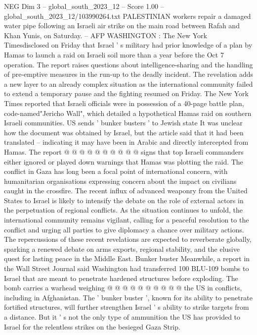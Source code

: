 \begin{textsample}{NEG Dim 3 – global\_south\_2023\_12 – Score 1.00 – global\_south\_2023\_12/103990264.txt}  \label{ex:f3_neg_011}
PALESTINIAN workers repair a damaged water pipe following an Israeli air strike on the main road between Rafah and Khan Yunis, on Saturday. -- AFP WASHINGTON : The New York Timesdisclosed on Friday that Israel ' s military had prior knowledge of a plan by Hamas to launch a raid on Israeli soil more than a year before the Oct 7 operation.
The report raises questions about intelligence-sharing and the handling of pre-emptive measures in the run-up to the deadly incident.
The revelation adds a new layer to an already complex situation as the international community failed to extend a temporary pause and the fighting resumed on Friday.
The New York Times reported that Israeli officials were in possession of a 40-page battle plan, code-named"Jericho Wall", which detailed a hypothetical Hamas raid on southern Israeli communities.
US sends ' bunker busters ' to Jewish state It was unclear how the document was obtained by Israel, but the article said that it had been translated -- indicating it may have been in Arabic and directly intercepted from Hamas.
The report @ @ @ @ @ @ @ @ @ @ signs that top Israeli commanders either ignored or played down warnings that Hamas was plotting the raid.
The conflict in Gaza has long been a focal point of international concern, with humanitarian organisations expressing concern about the impact on civilians caught in the crossfire.
The recent influx of advanced weaponry from the United States to Israel is likely to intensify the debate on the role of external actors in the perpetuation of regional conflicts.
As the situation continues to unfold, the international community remains vigilant, calling for a peaceful resolution to the conflict and urging all parties to give diplomacy a chance over military actions.
The repercussions of these recent revelations are expected to reverberate globally, sparking a renewed debate on arms exports, regional stability, and the elusive quest for lasting peace in the Middle East.
Bunker buster Meanwhile, a report in the Wall Street Journal said Washington had transferred 100 BLU-109 bombs to Israel that are meant to penetrate hardened structures before exploding.
The bomb carries a warhead weighing @ @ @ @ @ @ @ @ @ @ the US in conflicts, including in Afghanistan.
The ' bunker buster ', known for its ability to penetrate fortified structures, will further strengthen Israel ' s ability to strike targets from a distance.
But it ' s not the only type of ammunition the US has provided to Israel for the relentless strikes on the besieged Gaza Strip.

\end{textsample}
